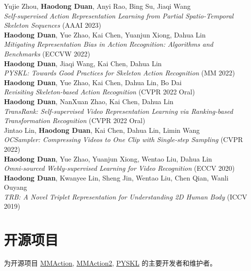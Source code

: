 \documentclass{resume}
\begin{document}
Yujie Zhou, \textbf{Haodong Duan}, Anyi Rao, Bing Su, Jiaqi Wang \\
\emph{Self-supervised Action Representation Learning from Partial Spatio-Temporal Skeleton Sequences} (AAAI 2023) \\

\textbf{Haodong Duan}, Yue Zhao, Kai Chen, Yuanjun Xiong, Dahua Lin\\
\emph{Mitigating Representation Bias in Action Recognition: Algorithms and Benchmarks} (ECCVW 2022) \\

\textbf{Haodong Duan}, Jiaqi Wang, Kai Chen, Dahua Lin\\
\emph{PYSKL: Towards Good Practices for Skeleton Action Recognition} (MM 2022) \\

\textbf{Haodong Duan}, Yue Zhao, Kai Chen, Dahua Lin, Bo Dai\\
\emph{Revisiting Skeleton-based Action Recognition} (CVPR 2022 Oral) \\

\textbf{Haodong Duan}, NanXuan Zhao, Kai Chen, Dahua Lin\\
\emph{TransRank: Self-supervised Video Representation Learning via Ranking-based Transformation Recognition} (CVPR 2022 Oral) \\

Jintao Lin, \textbf{Haodong Duan}, Kai Chen, Dahua Lin, Limin Wang \\
\emph{OCSampler: Compressing Videos to One Clip with Single-step Sampling} (CVPR 2022) \\

\textbf{Haodong Duan},  Yue Zhao, Yuanjun Xiong, Wentao Liu, Dahua Lin \\
\emph{Omni-sourced Webly-supervised Learning for Video Recognition} (ECCV 2020)  \\

\textbf{Haodong Duan}, Kwanyee Lin, Sheng Jin, Wentao Liu, Chen Qian,  Wanli Ouyang\\
\emph{TRB: A Novel Triplet Representation for Understanding 2D Human Body} (ICCV 2019)  \\

\vspace{-2mm}

\section{开源项目}
为开源项目 \href{https://github.com/open-mmlab/mmaction}{MMAction},  \href{https://github.com/open-mmlab/mmaction2}{MMAction2}, \href{https://github.com/kennymckormick/pyskl}{PYSKL} 的主要开发者和维护者。
\end{document}
